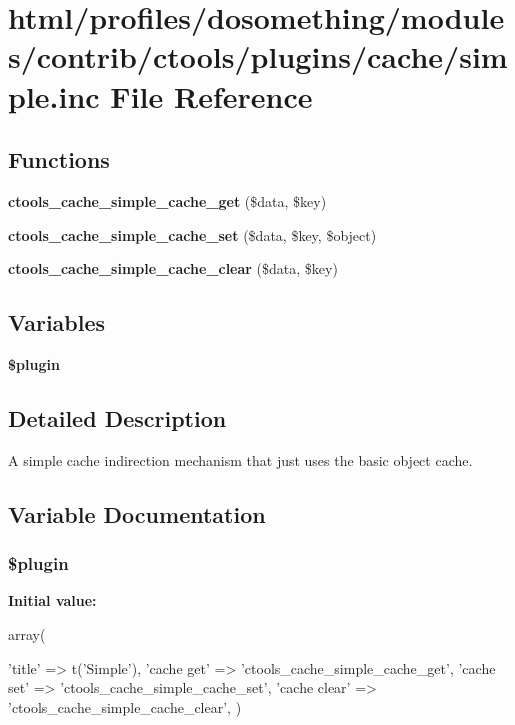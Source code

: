 \hypertarget{simple_8inc}{
\section{html/profiles/dosomething/modules/contrib/ctools/plugins/cache/simple.inc File Reference}
\label{simple_8inc}
}
\subsection*{Functions}
\begin{DoxyCompactItemize}
\item 
\hypertarget{simple_8inc_ae7b677b0da357bc992694e8f12f42c1d}{
{\bfseries ctools\_\-cache\_\-simple\_\-cache\_\-get} (\$data, \$key)}
\label{simple_8inc_ae7b677b0da357bc992694e8f12f42c1d}

\item 
\hypertarget{simple_8inc_a7920ebde9c8561528cf007f902501c81}{
{\bfseries ctools\_\-cache\_\-simple\_\-cache\_\-set} (\$data, \$key, \$object)}
\label{simple_8inc_a7920ebde9c8561528cf007f902501c81}

\item 
\hypertarget{simple_8inc_a5f3bf5d6fcaea15ebfadf70353e44365}{
{\bfseries ctools\_\-cache\_\-simple\_\-cache\_\-clear} (\$data, \$key)}
\label{simple_8inc_a5f3bf5d6fcaea15ebfadf70353e44365}

\end{DoxyCompactItemize}
\subsection*{Variables}
\begin{DoxyCompactItemize}
\item 
{\bfseries \$plugin}
\end{DoxyCompactItemize}


\subsection{Detailed Description}
A simple cache indirection mechanism that just uses the basic object cache. 

\subsection{Variable Documentation}
\hypertarget{simple_8inc_ada8a7130088351710bb02ed622d6bf65}{
\subsubsection[{\$plugin}]{\setlength{\rightskip}{0pt plus 5cm}\$plugin}}
\label{simple_8inc_ada8a7130088351710bb02ed622d6bf65}
{\bfseries Initial value:}
\begin{DoxyCode}
 array(
  
  
  'title' => t('Simple'),
  'cache get' => 'ctools_cache_simple_cache_get',
  'cache set' => 'ctools_cache_simple_cache_set',
  'cache clear' => 'ctools_cache_simple_cache_clear',
)
\end{DoxyCode}
